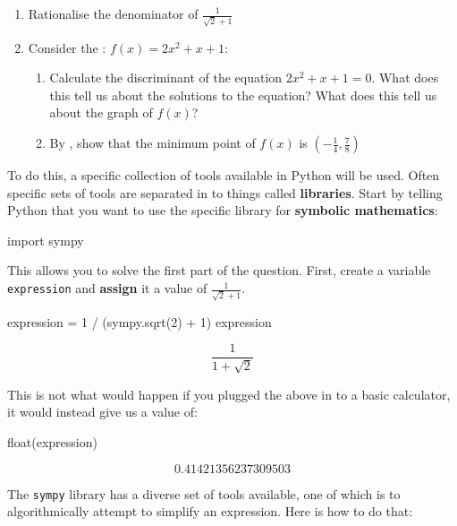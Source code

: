 \begin{enumerate}

\item 
Rationalise the denominator of \(\frac{1}{\sqrt{2} + 1}\)

\item 
Consider the : \(f(x)=2x ^ 2 + x + 1\):

\begin{enumerate}

\item Calculate the discriminant of the  equation \(2x ^ 2 + x + 1 =
0\). What does this tell us about the solutions to the equation? What
does this tell us about the graph of \(f(x)\)?

\item By , show that the minimum point of \(f(x)\) is
\(\left(-\frac{1}{4}, \frac{7}{8}\right)\)

\end{enumerate}

\end{enumerate}


To do this, a specific collection of tools available in Python will be used.
Often specific sets of tools are separated in to things called \textbf{libraries}. 
Start by telling Python that you want to use the specific library for \textbf{symbolic
mathematics}:

\begin{pyin}
import sympy
\end{pyin}

This allows you to solve the first part of the question. First, create a
variable \texttt{expression} and \textbf{assign} it a value of \(\frac{1}{\sqrt{2} + 1}\).

\begin{pyin}
expression = 1 / (sympy.sqrt(2) + 1)
expression
\end{pyin}

\[\frac{1}{1 + \sqrt{2}}\]

\begin{note}
This is not what would happen if you plugged the above in to a basic calculator,
it would instead give us a value of:
\end{note}


\begin{pyin}
float(expression)
\end{pyin}

\[0.41421356237309503\]

The \texttt{sympy} library has a diverse set of tools available, one of which is to
algorithmically attempt to simplify an expression. Here is how to do that:

